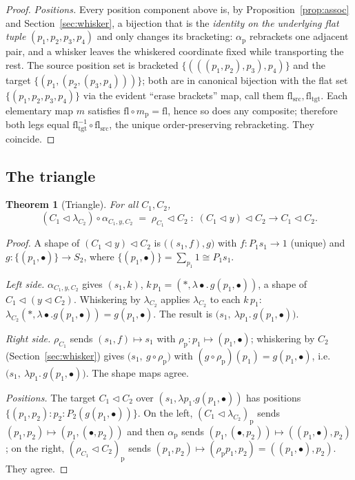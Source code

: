 \documentclass[11pt]{article}
\newtheorem{theorem}{Theorem}
\theoremstyle{definition}
\newcommand{\tri}{\mathbin{\triangleleft}}
\begin{document}
\begin{proof}
\emph{Positions.} Every position component above is, by
Proposition~\ref{prop:assoc} and Section~\ref{sec:whisker}, a bijection that is
the \emph{identity on the underlying flat tuple} $(p_1,p_2,p_3,p_4)$ and only
changes its bracketing: $\alpha_{\mathrm p}$ rebrackets one adjacent pair, and a
whisker leaves the whiskered coordinate fixed while transporting the rest. The
source position set is bracketed $\{(((p_1,p_2),p_3),p_4)\}$ and the target
$\{(p_1,(p_2,(p_3,p_4)))\}$; both are in canonical bijection with the flat set
$\{(p_1,p_2,p_3,p_4)\}$ via the evident ``erase brackets'' map, call them
$\mathrm{fl}_{\mathrm{src}},\mathrm{fl}_{\mathrm{tgt}}$. Each elementary map $m$
satisfies $\mathrm{fl}\circ m_{\mathrm p}=\mathrm{fl}$, hence so does any
composite; therefore both legs equal
$\mathrm{fl}_{\mathrm{tgt}}^{-1}\circ\mathrm{fl}_{\mathrm{src}}$, the unique
order-preserving rebracketing. They coincide.
\end{proof}

\subsection{The triangle}

\begin{theorem}[Triangle]\label{thm:triangle}
For all $C_1,C_2$,
\[
  (C_1\tri\lambda_{C_2})\circ\alpha_{C_1,y,C_2}
  \;=\;\rho_{C_1}\tri C_2
  \;\colon\;(C_1\tri y)\tri C_2\longrightarrow C_1\tri C_2 .
\]
\end{theorem}

\begin{proof}
A shape of $(C_1\tri y)\tri C_2$ is $\bigl((s_1,f),g\bigr)$ with
$f\colon P_1 s_1\to 1$ (unique) and $g\colon\{(p_1,\bullet)\}\to S_2$, where
$\{(p_1,\bullet)\}=\sum_{p_1}1\cong P_1 s_1$.

\emph{Left side.} $\alpha_{C_1,y,C_2}$ gives $(s_1,k)$,
$k\,p_1=(\ast,\lambda\bullet.\,g(p_1,\bullet))$, a shape of $C_1\tri(y\tri C_2)$.
Whiskering by $\lambda_{C_2}$ applies $\lambda_{C_2}$ to each $k\,p_1$:
$\lambda_{C_2}(\ast,\lambda\bullet.g(p_1,\bullet))=g(p_1,\bullet)$. The result is
$\bigl(s_1,\ \lambda p_1.\,g(p_1,\bullet)\bigr)$.

\emph{Right side.} $\rho_{C_1}$ sends $(s_1,f)\mapsto s_1$ with
$\rho_{\mathrm p}\colon p_1\mapsto(p_1,\bullet)$; whiskering by $C_2$
(Section~\ref{sec:whisker}) gives
$\bigl(s_1,\ g\circ\rho_{\mathrm p}\bigr)$ with
$(g\circ\rho_{\mathrm p})(p_1)=g(p_1,\bullet)$, i.e.\
$\bigl(s_1,\ \lambda p_1.\,g(p_1,\bullet)\bigr)$. The shape maps agree.

\emph{Positions.} The target $C_1\tri C_2$ over $(s_1,\lambda p_1.g(p_1,\bullet))$
has positions $\{(p_1,p_2):p_2:P_2(g(p_1,\bullet))\}$. On the left,
$(C_1\tri\lambda_{C_2})_{\mathrm p}$ sends $(p_1,p_2)\mapsto(p_1,(\bullet,p_2))$
and then $\alpha_{\mathrm p}$ sends $(p_1,(\bullet,p_2))\mapsto((p_1,\bullet),p_2)$;
on the right, $(\rho_{C_1}\tri C_2)_{\mathrm p}$ sends
$(p_1,p_2)\mapsto(\rho_{\mathrm p}p_1,p_2)=((p_1,\bullet),p_2)$. They agree.
\end{proof}
\end{document}
